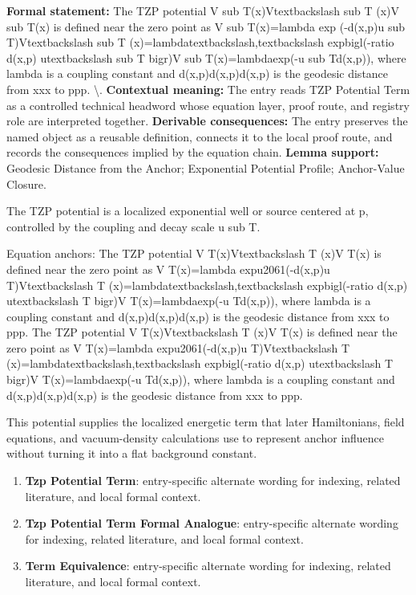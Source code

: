 \begingroup\footnotesize\setlength{\emergencystretch}{3em}\sloppy
\textbf{Formal statement:} The TZP potential V sub T(x)Vtextbackslash sub T (x)V sub T(x) is defined near the zero point as V sub T(x)=lambda exp (-d(x,p)u sub T)Vtextbackslash sub T (x)=lambdatextbackslash,textbackslash expbigl(-ratio d(x,p) utextbackslash sub T bigr)V sub T(x)=lambdaexp(-u sub Td(x,p)), where lambda is a coupling constant and d(x,p)d(x,p)d(x,p) is the geodesic distance from xxx to ppp. \textbackslash{}. \textbf{Contextual meaning:} The entry reads TZP Potential Term as a controlled technical headword whose equation layer, proof route, and registry role are interpreted together. \textbf{Derivable consequences:} The entry preserves the named object as a reusable definition, connects it to the local proof route, and records the consequences implied by the equation chain. \textbf{Lemma support:} Geodesic Distance from the Anchor; Exponential Potential Profile; Anchor-Value Closure.\par
\endgroup

The TZP potential is a localized exponential well or source centered at p, controlled by the coupling and decay scale u sub T.

Equation anchors: The TZP potential V T(x)Vtextbackslash T (x)V T(x) is defined near the zero point as V T(x)=lambda expu2061(-d(x,p)u T)Vtextbackslash T (x)=lambdatextbackslash,textbackslash expbigl(-ratio d(x,p) utextbackslash T bigr)V T(x)=lambdaexp(-u Td(x,p)), where lambda is a coupling constant and d(x,p)d(x,p)d(x,p) is the geodesic distance from xxx to ppp. The TZP potential V T(x)Vtextbackslash T (x)V T(x) is defined near the zero point as V T(x)=lambda expu2061(-d(x,p)u T)Vtextbackslash T (x)=lambdatextbackslash,textbackslash expbigl(-ratio d(x,p) utextbackslash T bigr)V T(x)=lambdaexp(-u Td(x,p)), where lambda is a coupling constant and d(x,p)d(x,p)d(x,p) is the geodesic distance from xxx to ppp.

This potential supplies the localized energetic term that later Hamiltonians, field equations, and vacuum-density calculations use to represent anchor influence without turning it into a flat background constant.
\endgroup

\begingroup\footnotesize\sloppy
\begin{enumerate}[leftmargin=1.35em,itemsep=1pt,topsep=1pt,parsep=0pt]
\item \textbf{Tzp Potential Term}: entry-specific alternate wording for indexing, related literature, and local formal context.
\item \textbf{Tzp Potential Term Formal Analogue}: entry-specific alternate wording for indexing, related literature, and local formal context.
\item \textbf{Term Equivalence}: entry-specific alternate wording for indexing, related literature, and local formal context.
\end{enumerate}
\endgroup

